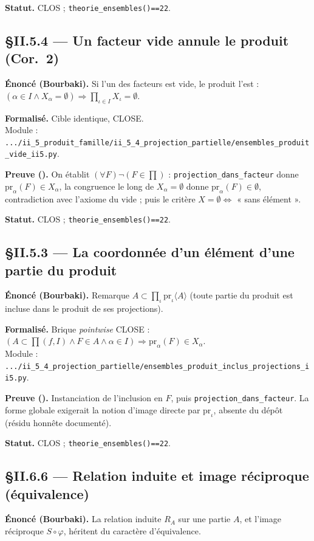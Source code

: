 \textbf{Statut.} CLOS ; \texttt{theorie\_ensembles()==22}.

\subsection{§II.5.4 --- Un facteur vide annule le produit (Cor.\ 2)}
\textbf{Énoncé (Bourbaki).} Si l'un des facteurs est vide, le produit l'est :
$(\alpha\in I \wedge X_\alpha=\emptyset) \Rightarrow \prod_{\iota\in I}X_\iota=\emptyset$.

\textbf{Formalisé.} Cible identique, CLOSE. \\
Module : \texttt{.../ii\_5\_produit\_famille/ii\_5\_4\_projection\_partielle/ensembles\_produit\_vide\_ii5.py}.

\textbf{Preuve (\Nstar).} On établit $(\forall F)\neg(F\in\prod)$ :
\texttt{projection\_dans\_facteur} donne $\mathrm{pr}_\alpha(F)\in X_\alpha$,
la congruence le long de $X_\alpha=\emptyset$ donne $\mathrm{pr}_\alpha(F)\in\emptyset$,
contradiction avec l'axiome du vide ; puis le critère $X=\emptyset \Leftrightarrow$ « sans élément ».

\textbf{Statut.} CLOS ; \texttt{theorie\_ensembles()==22}.

\subsection{§II.5.3 --- La coordonnée d'un élément d'une partie du produit}
\textbf{Énoncé (Bourbaki).} Remarque $A\subset\prod_\iota \mathrm{pr}_\iota\langle A\rangle$
(toute partie du produit est incluse dans le produit de ses projections).

\textbf{Formalisé.} Brique \emph{pointwise} CLOSE :
$(A\subset\prod(f,I) \wedge F\in A \wedge \alpha\in I) \Rightarrow \mathrm{pr}_\alpha(F)\in X_\alpha$. \\
Module : \texttt{.../ii\_5\_4\_projection\_partielle/ensembles\_produit\_inclus\_projections\_ii5.py}.

\textbf{Preuve (\Nstar).} Instanciation de l'inclusion en $F$, puis
\texttt{projection\_dans\_facteur}. La forme globale exigerait la notion d'image
directe par $\mathrm{pr}_\iota$, absente du dépôt (résidu honnête documenté).

\textbf{Statut.} CLOS ; \texttt{theorie\_ensembles()==22}.

\subsection{§II.6.6 --- Relation induite et image réciproque (équivalence)}
\textbf{Énoncé (Bourbaki).} La relation induite $R_A$ sur une partie $A$, et
l'image réciproque $S\circ\varphi$, héritent du caractère d'équivalence.

